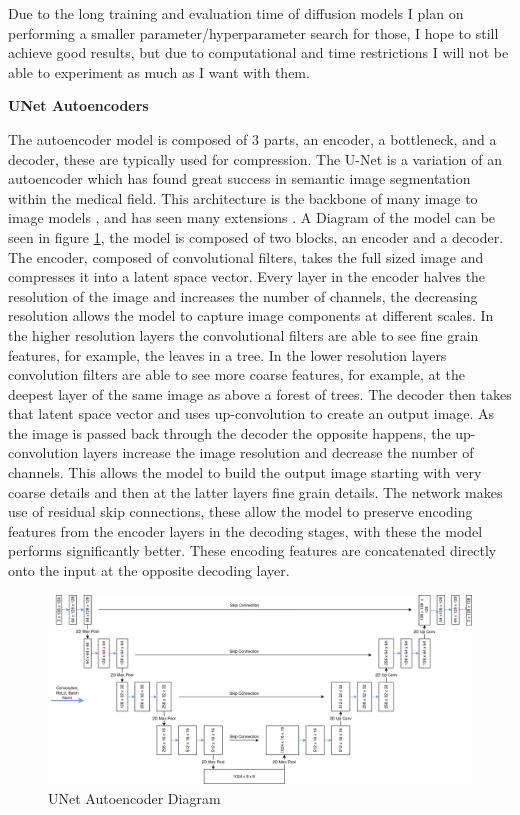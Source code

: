 \documentclass{UoYCSproject}
\begin{document}
Due to the long training and evaluation time of diffusion models I plan on performing a smaller parameter/hyperparameter search for those, I hope to still achieve good results, but due to computational and time restrictions I will not be able to experiment as much as I want with them.

\textbf{UNet Autoencoders}

The autoencoder model is composed of 3 parts, an encoder, a bottleneck, and a decoder, these are typically used for compression. The U-Net \cite{ronneberger2015unet} is a variation of an autoencoder which has found great success in semantic image segmentation within the medical field. This architecture is the backbone of many image to image models \cite{isola2018imagetoimage,saharia2022palette,dhariwal2021diffusion}, and has seen many extensions \cite{zhou2020unet, Qin_2020}. A Diagram of the model can be seen in figure \ref{fig:autoencoderDiagram}, the model is composed of two blocks, an encoder and a decoder. 
The encoder, composed of convolutional filters, takes the full sized image and compresses it into a latent space vector.
Every layer in the encoder halves the resolution of the image and increases the number of channels, the decreasing resolution allows the model to capture image components at different scales. 
In the higher resolution layers the convolutional filters are able to see fine grain features, for example, the leaves in a tree. In the lower resolution layers convolution filters are able to see more coarse features, for example, at the deepest layer of the same image as above a forest of trees. 
The decoder then takes that latent space vector and uses up-convolution to create an output image. 
As the image is passed back through the decoder the opposite happens, the up-convolution layers increase the image resolution and decrease the number of channels. This allows the model to build the output image starting with very coarse details and then at the latter layers fine grain details.
The network makes use of residual skip connections, these allow the model to preserve encoding features from the encoder layers in the decoding stages, with these the model performs significantly better. These encoding features are concatenated directly onto the input at the opposite decoding layer. 

\begin{figure}[ht]
    \centering
    \includegraphics[width=\linewidth]{UNet Diagram}
    \caption{UNet Autoencoder Diagram}
    \label{fig:autoencoderDiagram}
\end{figure}
\end{document}

